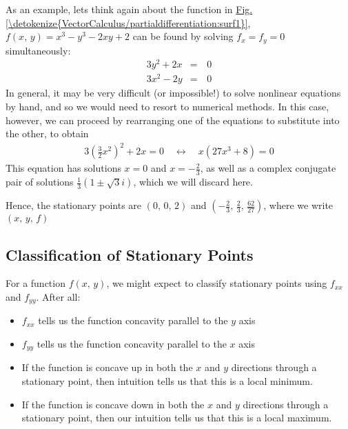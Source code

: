 \documentclass[letterpaper,10pt,english]{jupyterBook}
\begin{document}
\sphinxAtStartPar
As an example, lets think again about the function in \hyperref[\detokenize{VectorCalculus/partialdifferentiation:surf1}]{Fig.\@ \ref{\detokenize{VectorCalculus/partialdifferentiation:surf1}}}, \(f(x,\, y) = x^3 - y^3 - 2xy + 2\) can be found by solving \(f_x = f_y = 0\) simultaneously:
\begin{equation*}
\begin{split}3y^2+2x&=&\,0\\
3x^2-2y&=&\,0\end{split}
\end{equation*}
\sphinxAtStartPar
In general, it may be very difficult (or impossible!) to solve nonlinear equations by hand, and so we would need to resort to numerical methods. In this case,
however, we can proceed by rearranging one of the equations to substitute into the other, to obtain
\begin{equation*}
\begin{split}3\left(\frac{3}{2}x^2\right)^2+2x=0 \quad \leftrightarrow\quad x(27x^3+8)=0\end{split}
\end{equation*}
\sphinxAtStartPar
This equation has solutions \(x=0\) and \(x=-\frac{2}{3}\), as well as a complex conjugate pair of solutions \(\frac{1}{3}(1\pm\sqrt{3}i)\), which we will discard here.

\sphinxAtStartPar
Hence, the stationary points are \((0,\, 0,\, 2)\) and \(\left(-\frac{2}{3},\, \frac{2}{3},\, \frac{62}{27}\right)\), where we write \((x,\, y,\, f)\)


\subsection{Classification of Stationary Points}
\label{\detokenize{VectorCalculus/partialdifferentiation:classification-of-stationary-points}}
\sphinxAtStartPar
For a function \(f(x,\,y)\), we might expect to classify stationary points using \(f_{xx}\) and \(f_{yy}\). After all:
\begin{itemize}
\item {} 
\sphinxAtStartPar
\(f_{xx}\) tells us the function concavity parallel to the \(y\) axis

\item {} 
\sphinxAtStartPar
\(f_{yy}\) tells us the function concavity parallel to the \(x\) axis

\item {} 
\sphinxAtStartPar
If the function is concave up in both the \(x\) and \(y\) directions through a stationary point, then intuition tells us that this is a local minimum.

\item {} 
\sphinxAtStartPar
If the function is concave down in both the \(x\) and \(y\) directions through a stationary point, then our intuition tells us that this is a local maximum.

\end{itemize}
\end{document}
